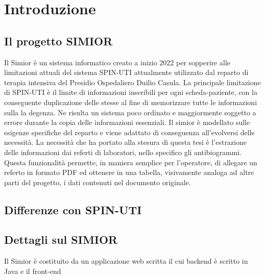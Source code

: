 \chapter{Introduzione}
\section{Il progetto SIMIOR}
Il Simior è un sistema informatico creato a inizio 2022 per sopperire alle limitazioni attuali del sistema SPIN-UTI attualmente utilizzato dal reparto di terapia intensiva del Presidio Ospedaliero Duilio Casula.
La principale limitazione di SPIN-UTI è il limite di informazioni inseribili per ogni scheda-paziente, con la conseguente duplicazione delle stesse al fine di memorizzare tutte le informazioni sulla la degenza. Ne risulta un sistema poco ordinato e maggiormente soggetto a errore durante la copia delle informazioni essenziali.
Il simior è modellato sulle esigenze specifiche del reparto e viene adattato di conseguenza all'evolversi delle necessità.
La necessità che ha portato alla stesura di questa tesi è l'estrazione delle informazioni dai referti di laboratori, nello specifico gli antibiogrammi.
Questa funzionalità permette, in maniera semplice per l'operatore, di allegare un referto in formato PDF ed ottenere in una tabella, visivamente analoga ad altre parti del progetto, i dati contenuti nel documento originale.
\section{Differenze con SPIN-UTI}
\section{Dettagli sul SIMIOR}
Il Simior è costituito da un applicazione web scritta il cui backend è scritto in Java e il front-end 

%
%


